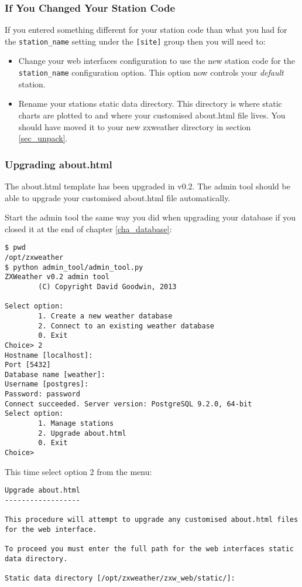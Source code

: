 \documentclass[a4paper,10pt,draft]{book}
\begin{document}
\subsubsection{If You Changed Your Station Code}
If you entered something different for your station code than what you had for the \verb|station_name| setting under the \verb|[site]| group then you will need to:
\begin{itemize}
\item Change your web interfaces configuration to use the new station code for the \verb|station_name| configuration option. This option now controls your \emph{default} station.
\item Rename your stations static data directory. This directory is where static charts are plotted to and where your customised about.html file lives. You should have moved it to your new zxweather directory in section \ref{sec_unpack}.
\end{itemize}

\subsubsection{Upgrading about.html}
The about.html template has been upgraded in v0.2. The admin tool should be able to upgrade your customised about.html file automatically.

Start the admin tool the same way you did when upgrading your database if you closed it at the end of chapter \ref{cha_database}:
\begin{verbatim}
$ pwd
/opt/zxweather
$ python admin_tool/admin_tool.py
ZXWeather v0.2 admin tool
        (C) Copyright David Goodwin, 2013

Select option:
        1. Create a new weather database
        2. Connect to an existing weather database
        0. Exit
Choice> 2
Hostname [localhost]:
Port [5432]
Database name [weather]: 
Username [postgres]:
Password: password
Connect succeeded. Server version: PostgreSQL 9.2.0, 64-bit
Select option:
        1. Manage stations
        2. Upgrade about.html
        0. Exit
Choice>
\end{verbatim}

This time select option 2 from the menu:
\begin{verbatim}
Upgrade about.html
------------------

This procedure will attempt to upgrade any customised about.html files 
for the web interface.

To proceed you must enter the full path for the web interfaces static 
data directory.

Static data directory [/opt/zxweather/zxw_web/static/]:
\end{verbatim}
\end{document}
